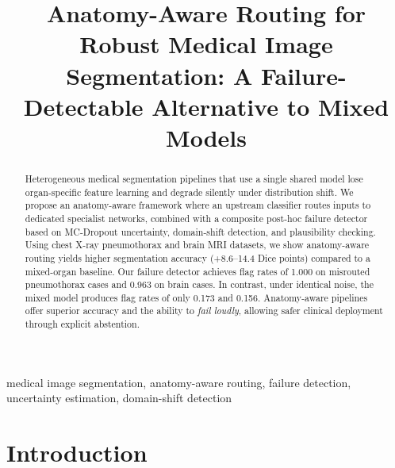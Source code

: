 \documentclass[a4paper,conference]{IEEEtran}
\begin{document}
\title{Anatomy-Aware Routing for Robust Medical Image Segmentation: A Failure-Detectable Alternative to Mixed Models}

\author{
\and
{}
}

\maketitle


\begin{abstract}
Heterogeneous medical segmentation pipelines that use a single shared model lose organ-specific feature learning and degrade silently under distribution shift. We propose an anatomy-aware framework where an upstream classifier routes inputs to dedicated specialist networks, combined with a composite post-hoc failure detector based on MC-Dropout uncertainty, domain-shift detection, and plausibility checking. Using chest X-ray pneumothorax and brain MRI datasets, we show anatomy-aware routing yields higher segmentation accuracy (+8.6--14.4 Dice points) compared to a mixed-organ baseline. Our failure detector achieves flag rates of 1.000 on misrouted pneumothorax cases and 0.963 on brain cases. In contrast, under identical noise, the mixed model produces flag rates of only 0.173 and 0.156. Anatomy-aware pipelines offer superior accuracy and the ability to \emph{fail loudly}, allowing safer clinical deployment through explicit abstention.
\end{abstract}

\begin{IEEEkeywords}
medical image segmentation, anatomy-aware routing, failure detection, uncertainty estimation, domain-shift detection
\end{IEEEkeywords}

\IEEEpubidadjcol

\section{Introduction}
\end{document}
